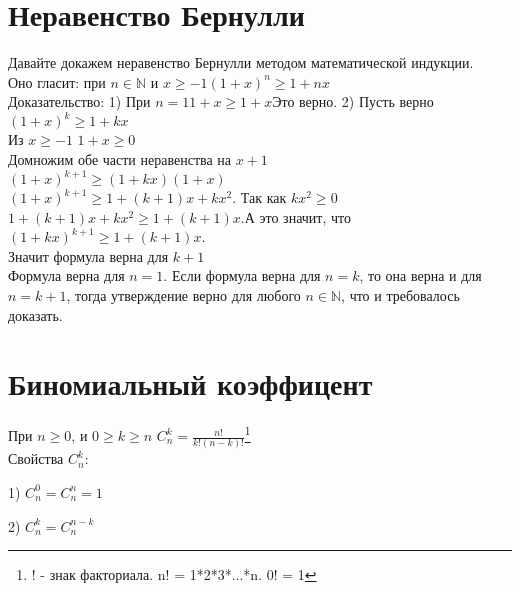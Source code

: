 \documentclass[a4paper,12pt]{article} %
\begin{document}
\section{Неравенство Бернулли}
Давайте докажем неравенство Бернулли методом математической индукции.\\
Оно гласит: при $n\in\mathbb{N}$ и $x\geq-1$\hspace{50pt}$(1+x)^n\geq 1+nx$\\
Доказательство:
1) При $n=1$\hspace{50pt}$1+x\geq1+x$\hspace{50pt}Это верно.
2) Пусть верно $(1+x)^k\geq1+kx$\\
Из $x\geq-1$ \hspace{10pt} $1+x\geq0$\\
Домножим обе части неравенства на $x+1$\\
$(1+x)^{k+1}\geq(1+kx)(1+x)$\\
$(1+x)^{k+1}\geq1+(k+1)x+kx^2$.\hspace{10pt} Так как $kx^2\geq0$\\
$1+(k+1)x+kx^2\geq1+(k+1)x$.\hspace{10pt}А это значит, что\\
$(1+kx)^{k+1}\geq1+(k+1)x$.\\
Значит формула верна для $k+1$\\
Формула верна для $n = 1$. Если формула верна для $n=k$, то она верна и для $n=k+1$, тогда утверждение верно для любого $n\in\mathbb{N}$, что и требовалось доказать.

\section{Биномиальный коэффицент}
При $n\geq 0$, и $0\geq k\geq n$ \hspace{10pt} $C_{n}^k = \frac{n!}{k!(n-k)!}$\footnote{! - знак факториала. n! = 1*2*3*...*n. 0! = 1}\\
Свойства $C_{n}^k$:

1) $C_{n}^0 = C_{n}^n = 1$

2) $C_{n}^k = C_{n}^{n-k}$
\end{document}
